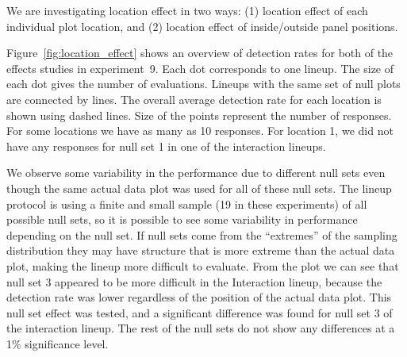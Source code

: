 \documentclass[10pt]{article}\usepackage[]{graphicx}\usepackage[]{color}
\begin{document}
We are investigating location effect in two ways: (1) location effect of each individual plot location, and (2) location effect of inside/outside panel positions.

Figure~\ref{fig:location_effect} shows an overview of detection rates for both of the effects studies in experiment~9. Each dot corresponds to one lineup. The size of each dot gives the number of evaluations. Lineups with  the same set of null plots are connected by lines.  
The overall average detection rate for each location is shown using dashed lines. Size of the points represent the number of responses. For some locations we have as many as 10 responses. For location 1, we did not have any responses for null set 1 in one of the interaction lineups.

We observe some variability in the performance due to different null sets even though the same actual data plot was used for all of  these null sets. The lineup protocol is using a finite and small sample (19 in these experiments) of all possible null sets, so it is possible to see some variability in performance depending on the null set. If null sets come from the ``extremes'' of the sampling distribution they may have structure that is more extreme than the actual data plot, making the lineup more difficult to evaluate. From the plot we can see that null set 3 appeared to be more difficult in the Interaction lineup, because the detection rate was lower regardless of the position of the actual data plot. This null set effect was tested, and a significant difference was found for null set 3 of the interaction lineup. The rest of the null sets do not show any differences at  a 1\% significance level. 

\end{document}
